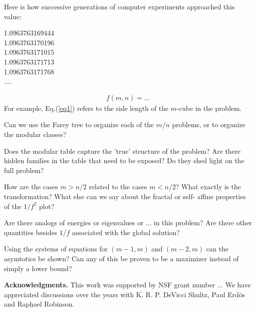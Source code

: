 \documentclass[superscriptaddress,reprint,amsmath,amssymb,aps]{revtex4-1}
\begin{document}
Here is how successive generations of computer experiments approached this
value:
\vspace{-0.05in}
\begin{center}
1.0963763169444 \\
\vspace{-0.02in}
1.0963763170196 \\
\vspace{-0.02in}
1.0963763171015 \\
\vspace{-0.02in}
1.0963763171713 \\
\vspace{-0.02in}
1.0963763171768 \\
\vspace{-0.05in}
....
\end{center}

\begin{align}
f(m,n) = ...
\label{eq1}
\end{align}
For example, Eq.(\ref{eq1}) refers to the side length of the $m$-cube in the
problem.

\vspace{.15in}



Can we use the Farey tree to organize each of the $m/n$ problems, or to
organize the modular classes?

Does the modular table capture the ’true’ structure of the problem?  Are
there hidden families in the table that need to be exposed?  Do they shed
light on the full problem?

How are the cases $m > n/2$ related to the cases $m < n/2$?  What exactly
is the transformation?  What else can we say about the fractal or self‐
affine properties of the $1/f^2$ plot?

Are there analogs of energies or eigenvalues or ... in this problem? Are
there other quantities besides $1/f$ associated with the global solution?

Using the systems of equations for $(m-1,m)$ and $(m-2,m)$ can the asymtotics
be shown?  Can any of this be proven to be a maximizer instead of simply a
lower bound?



{\bf Acknowledgments.}
This work was supported by NSF grant number ... 
We have appreciated discussions over the years with K. R. P. DeVicci Shultz, Paul Erd\"os and Raphael Robinson.
\end{document}
